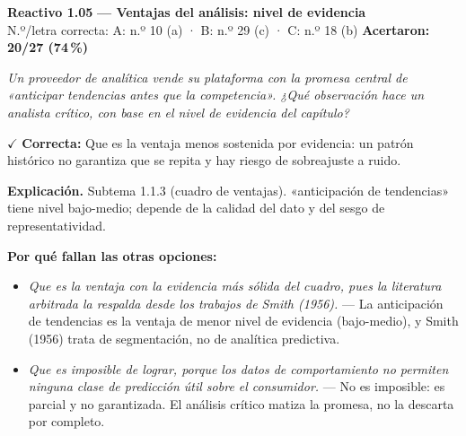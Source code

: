\documentclass[10pt,letterpaper]{article}
\begin{document}
\begin{minipage}{\textwidth}
{\color{guinda}\textbf{Reactivo 1.05}} \textbf{— Ventajas del análisis: nivel de evidencia}\\[-1pt]
{\scriptsize N.º/letra correcta: A: n.º 10 (a) · B: n.º 29 (c) · C: n.º 18 (b) \hfill \textbf{Acertaron: 20/27 (74\,\%)}}

\textit{Un proveedor de analítica vende su plataforma con la promesa central de «anticipar tendencias antes que la competencia». ¿Qué observación hace un analista crítico, con base en el nivel de evidencia del capítulo?}

\textcolor{verde}{$\checkmark$} \textbf{Correcta:} Que es la ventaja menos sostenida por evidencia: un patrón histórico no garantiza que se repita y hay riesgo de sobreajuste a ruido.

\textbf{Explicación.} Subtema 1.1.3 (cuadro de ventajas). «anticipación de tendencias» tiene nivel bajo-medio; depende de la calidad del dato y del sesgo de representatividad.

\textbf{Por qué fallan las otras opciones:}
\begin{itemize}[itemsep=0pt,topsep=1pt,leftmargin=1.3em,parsep=0pt]
\item[\textcolor{rojo}{$\times$}] \textit{Que es la ventaja con la evidencia más sólida del cuadro, pues la literatura arbitrada la respalda desde los trabajos de Smith (1956).} --- La anticipación de tendencias es la ventaja de menor nivel de evidencia (bajo-medio), y Smith (1956) trata de segmentación, no de analítica predictiva.
\item[\textcolor{rojo}{$\times$}] \textit{Que es imposible de lograr, porque los datos de comportamiento no permiten ninguna clase de predicción útil sobre el consumidor.} --- No es imposible: es parcial y no garantizada. El análisis crítico matiza la promesa, no la descarta por completo.
\end{itemize}
\end{minipage}\par\vspace{5pt}{\color{gray!40}\hrule}\vspace{5pt}
\end{document}
